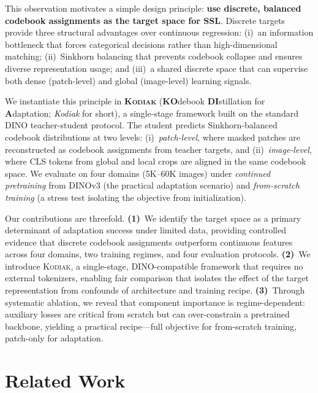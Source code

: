 \documentclass[runningheads]{llncs}
\newcommand{\method}{\textsc{Kodiak}}
\begin{document}
This observation motivates a simple design principle: \textbf{use discrete, balanced codebook assignments as the target space for SSL}.
Discrete targets provide three structural advantages over continuous regression: (i)~an information bottleneck that forces categorical decisions rather than high-dimensional matching; (ii)~Sinkhorn balancing that prevents codebook collapse and ensures diverse representation usage; and (iii)~a shared discrete space that can supervise both dense (patch-level) and global (image-level) learning signals.

We instantiate this principle in \textbf{\method{}} (\textbf{KO}debook \textbf{DI}stillation for \textbf{A}daptation; \textit{Kodiak} for short), a single-stage framework built on the standard DINO teacher-student protocol.
The student predicts Sinkhorn-balanced codebook distributions at two levels: (i)~\emph{patch-level}, where masked patches are reconstructed as codebook assignments from teacher targets, and (ii)~\emph{image-level}, where CLS tokens from global and local crops are aligned in the same codebook space.
We evaluate on four domains (5K--60K images) under \emph{continued pretraining} from DINOv3 (the practical adaptation scenario) and \emph{from-scratch training} (a stress test isolating the objective from initialization).

Our contributions are threefold.
\textbf{(1)}~We identify the target space as a primary determinant of adaptation success under limited data, providing controlled evidence that discrete codebook assignments outperform continuous features across four domains, two training regimes, and four evaluation protocols.
\textbf{(2)}~We introduce \method{}, a single-stage, DINO-compatible framework that requires no external tokenizers, enabling fair comparison that isolates the effect of the target representation from confounds of architecture and training recipe.
\textbf{(3)}~Through systematic ablation, we reveal that component importance is regime-dependent: auxiliary losses are critical from scratch but can over-constrain a pretrained backbone, yielding a practical recipe---full objective for from-scratch training, patch-only for adaptation.


\section{Related Work}
\label{sec:related}
\end{document}
